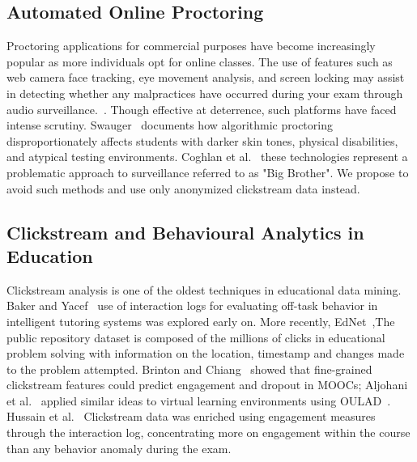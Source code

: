 \documentclass[sigconf]{acmart}
\begin{document}
\subsection{Automated Online Proctoring}
Proctoring applications for commercial purposes have become increasingly popular as more individuals opt for online classes. The use of features such as web camera face tracking, eye movement analysis, and screen locking may assist in detecting whether any malpractices have occurred during your exam through audio surveillance.~\cite{nigam2021systematic}. Though effective at deterrence, such platforms have faced intense scrutiny. Swauger~\cite{swauger2020software} documents how algorithmic proctoring disproportionately affects students with darker skin tones, physical disabilities, and atypical testing environments. Coghlan et al.~\cite{coghlan2021good} these technologies represent a problematic approach to surveillance referred to as "Big Brother". We propose to avoid such methods and use only anonymized clickstream data instead.

\subsection{Clickstream and Behavioural Analytics in Education}
Clickstream analysis is one of the oldest techniques in educational data mining. Baker and Yacef~\cite{baker2010data} use of interaction logs for evaluating off-task behavior in intelligent tutoring systems was explored early on. More recently, EdNet~\cite{choi2020ednet},The public repository dataset is composed of the millions of clicks in educational problem solving with information on the location, timestamp and changes made to the problem attempted. Brinton and Chiang~\cite{brinton2015mooc} showed that fine-grained clickstream features could predict engagement and dropout in MOOCs; Aljohani et al.~\cite{aljohani2019predicting} applied similar ideas to virtual learning environments using OULAD~\cite{open_university_learning_analytics_dataset_349}. Hussain et al.~\cite{hussain2018student} Clickstream data was enriched using engagement measures through the interaction log, concentrating more on engagement within the course than any behavior anomaly during the exam.
\end{document}
